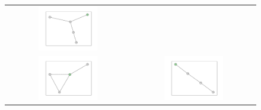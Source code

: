 \documentclass[12pt, a4paper]{extarticle}
\begin{document}
\begin{figure}
\begin{tabularx}{\textwidth}{cc}
\includegraphics[width=0.5\textwidth]{task11-graphlets/5_10-14-21-22-23.pdf} \\
\includegraphics[width=0.5\textwidth]{task11-graphlets/4_18-25-23-24.pdf} &
\includegraphics[width=0.5\textwidth]{task11-graphlets/4_10-16-18-23.pdf} \\
\end{tabularx}\end{figure}
\end{document}
